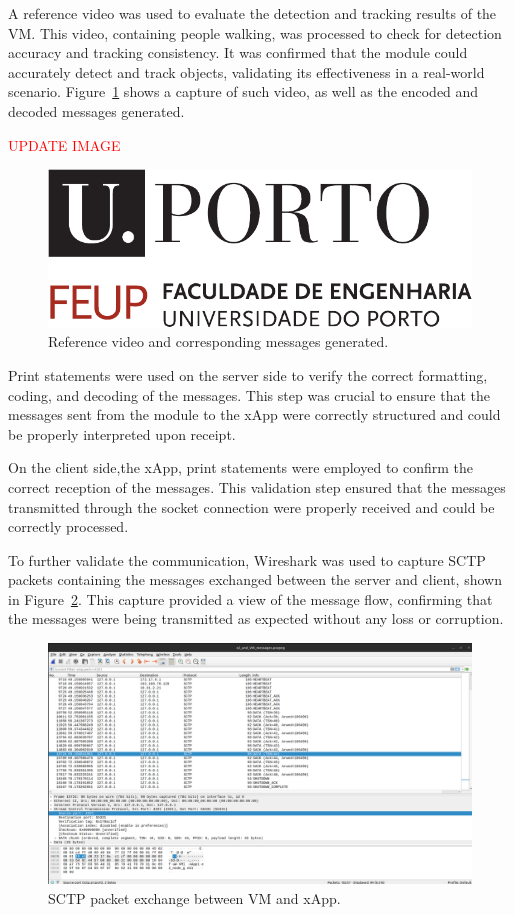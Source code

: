 A reference video was used to evaluate the detection and tracking results of the VM\@.
This video, containing people walking, was processed to check for detection accuracy and tracking consistency.
It was confirmed that the module could accurately detect and track objects, validating its effectiveness in a real-world scenario.
Figure~\ref{fig:reference_video} shows a capture of such video, as well as the encoded and decoded messages generated.

\textcolor{red}{UPDATE IMAGE}
\begin{figure}[H]
    \centering
    \includegraphics[width=0.5\linewidth]{figures/uporto-feup}
    \caption{Reference video and corresponding messages generated.}
    \label{fig:reference_video}
\end{figure}

Print statements were used on the server side to verify the correct formatting, coding, and decoding of the messages.
This step was crucial to ensure that the messages sent from the module to the xApp were correctly structured and could be properly interpreted upon receipt.

On the client side,the xApp, print statements were employed to confirm the correct reception of the messages.
This validation step ensured that the messages transmitted through the socket connection were properly received and could be correctly processed.

To further validate the communication, Wireshark was used to capture SCTP packets containing the messages exchanged between the server and client, shown in Figure~\ref{fig:capture_messages}.
This capture provided a view of the message flow, confirming that the messages were being transmitted as expected without any loss or corruption.

\begin{figure}[H]
    \centering
    \includegraphics[width=0.5\linewidth]{figures/vm_xapp}
    \caption[SCTP packet exchange between VM and xApp]{SCTP packet exchange between VM and xApp.}
    \label{fig:capture_messages}
\end{figure}

